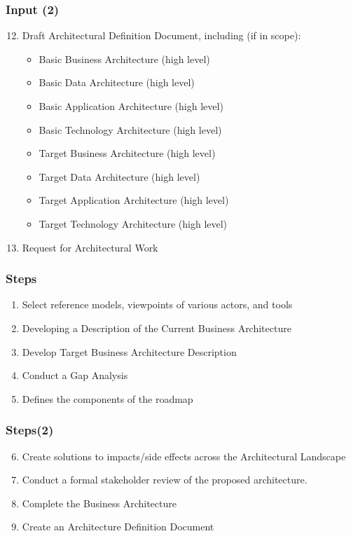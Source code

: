 \documentclass[aspectratio=169, table]{beamer}
\begin{document}
    \begin{frame}
        \frametitle{Input (2)}
        \begin{enumerate}
            \setcounter{enumi}{11}
            \item Draft Architectural Definition Document, including (if in scope):
            \begin{itemize}
                \item Basic Business Architecture (high level)
                \item Basic Data Architecture (high level)
                \item Basic Application Architecture (high level)
                \item Basic Technology Architecture (high level)
                \item Target Business Architecture (high level)
                \item Target Data Architecture (high level)
                \item Target Application Architecture (high level)
                \item Target Technology Architecture (high level)
            \end{itemize}
            \item Request for Architectural Work
        \end{enumerate}
    \end{frame}

    \begin{frame}
        \frametitle{Steps}
        \begin{enumerate}
            \item Select reference models, viewpoints of various actors, and tools
            \item Developing a Description of the Current Business Architecture
            \item Develop Target Business Architecture Description
            \item Conduct a Gap Analysis
            \item Defines the components of the roadmap
        \end{enumerate}


    \end{frame}

    \begin{frame}
        \frametitle{Steps(2)}
        \begin{enumerate}
            \setcounter{enumi}{5}
            \item Create solutions to impacts/side effects across the Architectural Landscape
            \item Conduct a formal stakeholder review of the proposed architecture.
            \item Complete the Business Architecture
            \item Create an Architecture Definition Document
        \end{enumerate}


    \end{frame}
\end{document}
